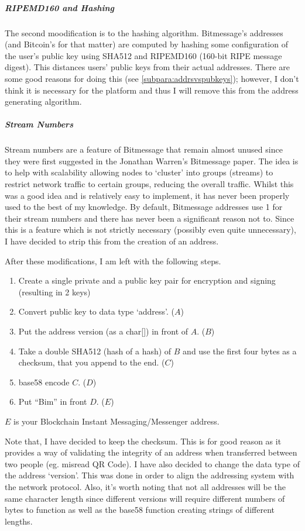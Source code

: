 \documentclass{article}
\begin{document}
\subparagraph{RIPEMD160 and Hashing} The second moodification is to the hashing algorithm. Bitmessage's addresses (and Bitcoin's for that matter) are computed by hashing some configuration of the user's public key using SHA512 and RIPEMD160 (160-bit RIPE message digest). This distances users' public keys from their actual addresses. There are some good reasons for doing this (see \autoref{subpara:addrsvspubkeys}); however, I don't think it is necessary for the platform and thus I will remove this from the address generating algorithm.

\subparagraph{Stream Numbers} Stream numbers are a feature of Bitmessage that remain almost unused since they were first suggested in the Jonathan Warren's Bitmessage paper\cite{bitmessage_paper}. The idea is to help with scalability allowing nodes to `cluster' into groups (streams) to restrict network traffic to certain groups, reducing the overall traffic. Whilst this was a good idea and is relatively easy to implement, it has never been properly used to the best of my knowledge. By default, Bitmessage addresses use 1 for their stream numbers and there has never been a significant reason not to. Since this is a feature which is not strictly necessary (possibly even quite unnecessary), I have decided to strip this from the creation of an address.


After these modifications, I am left with the following steps.
\begin{enumerate}
    \item Create a single private and a public key pair for encryption and signing (resulting in 2 keys)
    \item Convert public key to data type `address'. ($A$)
    \item Put the address version (as a char[\hspace{0.05cm}]) in front of $A$. ($B$)
    \item Take a double SHA512 (hash of a hash) of $B$ and use the first four bytes as a checksum, that you append to the end. ($C$)
    \item base58 encode $C$. ($D$)
    \item Put ``Bim'' in front $D$. ($E$)
\end{enumerate}
$E$ is your Blockchain Instant Messaging/Messenger address.

Note that, I have decided to keep the checksum. This is for good reason as it provides a way of validating the integrity of an address when transferred between two people (eg. misread QR Code). I have also decided to change the data type of the address `version'. This was done in order to align the addressing system with the network protocol. Also, it's worth noting that not all addresses will be the same character length since different versions will require different numbers of bytes to function as well as the base58 function creating strings of different lengths.
\end{document}
